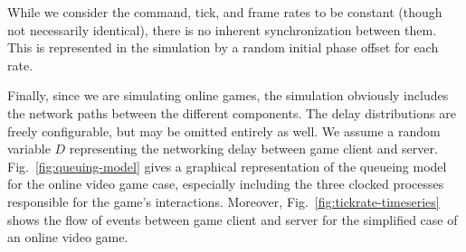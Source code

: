 While we consider the command, tick, and frame rates to be constant (though not necessarily identical), there is no inherent synchronization between them. This is represented in the simulation by a random initial phase offset for each rate.

Finally, since we are simulating online games, the simulation obviously includes the network paths between the different components. The delay distributions are freely configurable, but may be omitted entirely as well. We assume a random variable $D$ representing the networking delay between game client and server. Fig.~\ref{fig:queuing-model} gives a graphical representation of the queueing model for the online video game case, especially including the three clocked processes responsible for the game's interactions.
Moreover, Fig.~\ref{fig:tickrate-timeseries} shows the flow of events between game client and server for the simplified case of an online video game.






